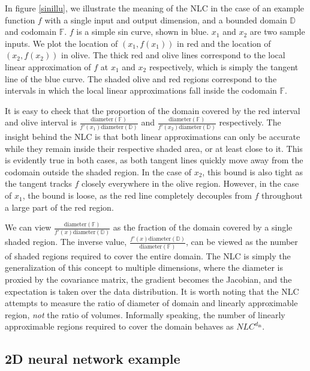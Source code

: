 \documentclass{article} %
\begin{document}
In figure \ref{sinillu}, we illustrate the meaning of the NLC in the case of an example function $f$ with a single input and output dimension, and a bounded domain $\mathbb{D}$ and codomain $\mathbb{F}$. $f$ is a simple sin curve, shown in blue. $x_1$ and $x_2$ are two sample inputs. We plot the location of $(x_1,f(x_1))$ in red and the location of $(x_2,f(x_2))$ in olive. The thick red and olive lines correspond to the local linear approximation of $f$ at $x_1$ and $x_2$ respectively, which is simply the tangent line of the blue curve. The shaded olive and red regions correspond to the intervals in which the local linear approximations fall inside the codomain $\mathbb{F}$. 


It is easy to check that the proportion of the domain covered by the red interval and olive interval is $\frac{\text{diameter}(\mathbb{F})}{f'(x_1)\text{diameter}(\mathbb{D})}$ and $\frac{\text{diameter}(\mathbb{F})}{f'(x_2)\text{diameter}(\mathbb{D})}$ respectively. The insight behind the NLC is that both linear approximations can only be accurate while they remain inside their respective shaded area, or at least close to it. This is evidently true in both cases, as both tangent lines quickly move away from the codomain outside the shaded region. In the case of $x_2$, this bound is also tight as the tangent tracks $f$ closely everywhere in the olive region. However, in the case of $x_1$, the bound is loose, as the red line completely decouples from $f$ throughout a large part of the red region. 

We can view $\frac{\text{diameter}(\mathbb{F})}{f'(x)\text{diameter}(\mathbb{D})}$ as the fraction of the domain covered by a single shaded region. The inverse value, $\frac{f'(x)\text{diameter}(\mathbb{D})}{\text{diameter}(\mathbb{F})}$, can be viewed as the number of shaded regions required to cover the entire domain. The NLC is simply the generalization of this concept to multiple dimensions, where the diameter is proxied by the covariance matrix, the gradient becomes the Jacobian, and the expectation is taken over the data distribution. It is worth noting that the NLC attempts to measure the ratio of diameter of domain and linearly approximable region, {\it not} the ratio of volumes. Informally speaking, the number of linearly approximable regions required to cover the domain behaves as $NLC^{d_\text{in}}$.

\subsection{2D neural network example}
\end{document}
